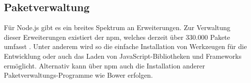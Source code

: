 \subsection{Paketverwaltung}
Für Node.js gibt es ein breites Spektrum an Erweiterungen. Zur Verwaltung dieser Erweiterungen existiert der \ac{npm}, welches derzeit über 330.000 Pakete umfasst \cite{DeBill2016}. Unter anderem wird so die einfache Installation von Werkzeugen für die Entwicklung oder auch das Laden von JavaScript-Bibliotheken und Frameworks ermöglicht. Alternativ kann über \ac{npm} auch die Installation anderer Paketverwaltungs-Programme wie Bower \cite{bower.io} erfolgen. 